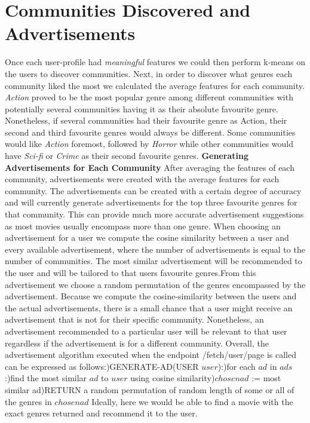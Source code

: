 \documentclass{article}
\newcommand\tab[1][1cm]{\hspace*{#1}}
\begin{document}
\section{Communities Discovered and Advertisements}
Once each user-profile had \textit{meaningful} features we could then perform k-means on the users to discover communities. Next, in order to discover what genres each community liked the most we calculated the average features for each community. \textit{Action} proved to be the most popular genre among different communities with potentially several communities having it as their absolute favourite genre. Nonetheless, if several communities had their favourite genre as Action, their second and third favourite genres would always be different. Some communities would like \textit{Action} foremost, followed by \textit{Horror} while other communities would have \textit{Sci-fi} or \textit{Crime} as their second favourite genres.\newline\newline
\textbf{Generating Advertisements for Each Community}\newline
After averaging the features of each community, advertisements were created with the average features for each community. The advertisements can be created with a certain degree of accuracy and will currently generate advertisements for the top three favourite genres for that community. This can provide much more accurate advertisement suggestions as most movies usually encompass more than one genre. When choosing an advertisement for a user we compute the cosine similarity between a user and every available advertisement, where the number of advertisements is equal to the number of communities. The most similar advertisement will be recommended to the user and will be tailored to that users favourite genres.From this advertisement we choose a random permutation of the genres encompassed by the advertisement. Because we compute the cosine-similarity between the users and the actual advertisements, there is a small chance that a user might receive an advertisement that is not for their specific community. Nonetheless, an advertisement recommended to a particular user will be relevant to that user regardless if the advertisement is for a different community. \newline\newline
Overall, the advertisement algorithm executed when the endpoint  /fetch/{user}/{page} is called can be expressed as follows:)\tab  GENERATE-AD(USER $user$):)\tab\tab for each $ad$ in $ads$:)\tab\tab\tab find the most similar $ad$ to $user$ using cosine similarity)\tab\tab\tab $chosenad$ := most similar ad)\tab RETURN a random permutation of random length of some or all of the genres in $chosenad$\newline\newline
Ideally, here we would be able to find a movie with the exact genres returned and recommend it to the user. 
\end{document}
